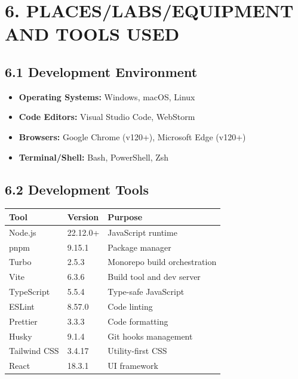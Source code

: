 \documentclass[12pt,a4paper]{article}
\begin{document}
\vspace{0.5cm}

\section*{\textbf{6. PLACES/LABS/EQUIPMENT AND TOOLS USED}}

\subsection*{\textbf{6.1 Development Environment}}

\begin{itemize}
    \item \textbf{Operating Systems:} Windows, macOS, Linux
    \item \textbf{Code Editors:} Visual Studio Code, WebStorm
    \item \textbf{Browsers:} Google Chrome (v120+), Microsoft Edge (v120+)
    \item \textbf{Terminal/Shell:} Bash, PowerShell, Zsh
\end{itemize}

\subsection*{\textbf{6.2 Development Tools}}

\begin{table}[h]
\centering
\begin{tabular}{|l|l|p{4cm}|}
\hline
\textbf{Tool} & \textbf{Version} & \textbf{Purpose} \\
\hline
Node.js & 22.12.0+ & JavaScript runtime \\
\hline
pnpm & 9.15.1 & Package manager \\
\hline
Turbo & 2.5.3 & Monorepo build orchestration \\
\hline
Vite & 6.3.6 & Build tool and dev server \\
\hline
TypeScript & 5.5.4 & Type-safe JavaScript \\
\hline
ESLint & 8.57.0 & Code linting \\
\hline
Prettier & 3.3.3 & Code formatting \\
\hline
Husky & 9.1.4 & Git hooks management \\
\hline
Tailwind CSS & 3.4.17 & Utility-first CSS \\
\hline
React & 18.3.1 & UI framework \\
\hline
\end{tabular}
\end{table}
\end{document}
